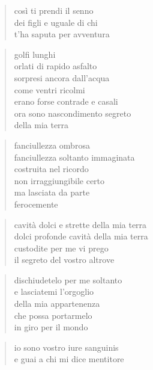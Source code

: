 \begin{verse}
    così ti prendi il senno\\
    dei figli e uguale di chi\\
    t’ha saputa per avventura
\end{verse}

\clearpage


\begin{verse}
    golfi lunghi\\
    orlati di rapido asfalto\\
    sorpresi ancora dall’acqua\\
    come ventri ricolmi\\
    erano forse contrade e casali\\
    ora sono nascondimento segreto\\
    della mia terra
\end{verse}

\clearpage


\begin{verse}
    fanciullezza ombrosa\\
    fanciullezza soltanto immaginata\\
    costruita nel ricordo\\
    non irraggiungibile certo\\
    ma lasciata da parte\\
    ferocemente
\end{verse}

\begin{verse}
    cavità dolci e strette della mia terra\\
    dolci profonde cavità della mia terra\\
    custodite per me vi prego\\
    il segreto del vostro altrove
\end{verse}

\begin{verse}
    dischiudetelo per me soltanto\\
    e lasciatemi l’orgoglio\\
    della mia appartenenza\\
    che possa portarmelo\\
    in giro per il mondo
\end{verse}

\begin{verse}
    io sono vostro iure sanguinis\\
    e guai a chi mi dice mentitore
\end{verse}

